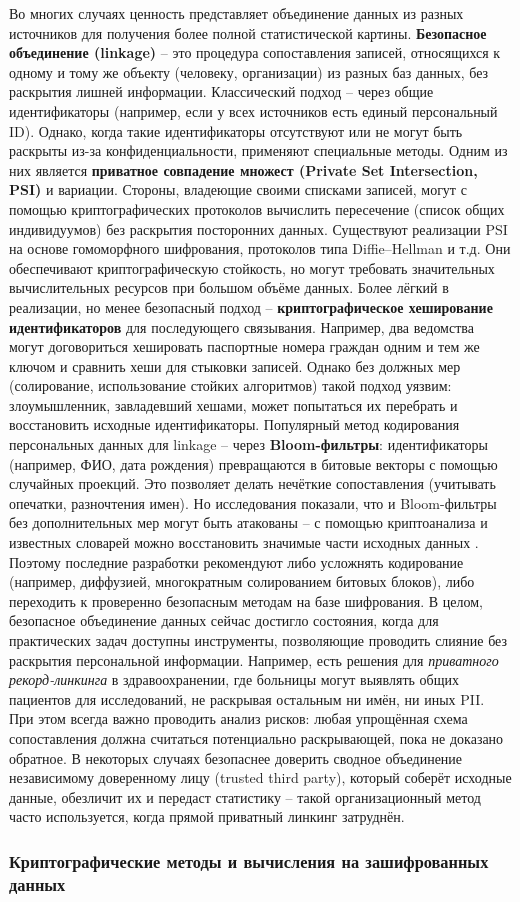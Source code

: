 Во многих случаях ценность представляет объединение данных из разных источников для получения более полной статистической картины. \textbf{Безопасное объединение (linkage)} – это процедура сопоставления записей, относящихся к одному и тому же объекту (человеку, организации) из разных баз данных, без раскрытия лишней информации. Классический подход – через общие идентификаторы (например, если у всех источников есть единый персональный ID). Однако, когда такие идентификаторы отсутствуют или не могут быть раскрыты из-за конфиденциальности, применяют специальные методы. Одним из них является \textbf{приватное совпадение множест (Private Set Intersection, PSI)} и вариации. Стороны, владеющие своими списками записей, могут с помощью криптографических протоколов вычислить пересечение (список общих индивидуумов) без раскрытия посторонних данных. Существуют реализации PSI на основе гомоморфного шифрования, протоколов типа Diffie–Hellman и т.д. Они обеспечивают криптографическую стойкость, но могут требовать значительных вычислительных ресурсов при большом объёме данных. Более лёгкий в реализации, но менее безопасный подход – \textbf{криптографическое хеширование идентификаторов} для последующего связывания. Например, два ведомства могут договориться хешировать паспортные номера граждан одним и тем же ключом и сравнить хеши для стыковки записей. Однако без должных мер (солирование, использование стойких алгоритмов) такой подход уязвим: злоумышленник, завладевший хешами, может попытаться их перебрать и восстановить исходные идентификаторы. Популярный метод кодирования персональных данных для linkage – через \textbf{Bloom-фильтры}: идентификаторы (например, ФИО, дата рождения) превращаются в битовые векторы с помощью случайных проекций. Это позволяет делать нечёткие сопоставления (учитывать опечатки, разночтения имен). Но исследования показали, что и Bloom-фильтры без дополнительных мер могут быть атакованы – с помощью криптоанализа и известных словарей можно восстановить значимые части исходных данных \autocite{journalprivacyconfidentiality-org}. Поэтому последние разработки рекомендуют либо усложнять кодирование (например, диффузией, многократным солированием битовых блоков), либо переходить к проверенно безопасным методам на базе шифрования. В целом, безопасное объединение данных сейчас достигло состояния, когда для практических задач доступны инструменты, позволяющие проводить слияние без раскрытия персональной информации. Например, есть решения для \textit{приватного рекорд-линкинга} в здравоохранении, где больницы могут выявлять общих пациентов для исследований, не раскрывая остальным ни имён, ни иных PII. При этом всегда важно проводить анализ рисков: любая упрощённая схема сопоставления должна считаться потенциально раскрывающей, пока не доказано обратное. В некоторых случаях безопаснее доверить сводное объединение независимому доверенному лицу (trusted third party), который соберёт исходные данные, обезличит их и передаст статистику – такой организационный метод часто используется, когда прямой приватный линкинг затруднён. \subsubsection{Криптографические методы и вычисления на зашифрованных данных}

